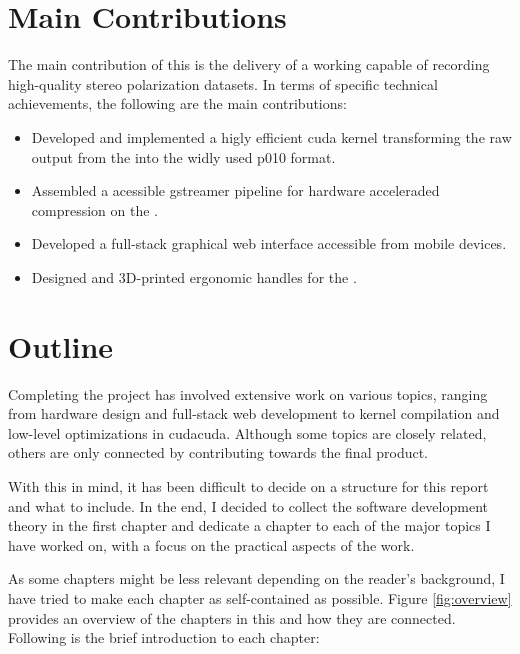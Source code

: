 \section{Main Contributions}
The main contribution of this \master is the delivery of a working \sr capable of recording high-quality stereo polarization datasets.
In terms of specific technical achievements, the following are the main contributions:

\begin{itemize}
    \item Developed and implemented a higly efficient \gls{cuda} kernel transforming the raw output from the \cams into the widly used \gls{p010} format.
    \item Assembled a \py acessible \gls{gstreamer} pipeline for hardware acceleraded compression on the \jx.
    \item Developed a full-stack graphical web interface accessible from mobile devices.
    \item Designed and 3D-printed ergonomic handles for the \sr.
\end{itemize}


\section{Outline}
Completing the \sr project has involved extensive work on various topics, ranging from hardware design and full-stack web development to kernel compilation and low-level optimizations in \gls{cuda}{cuda}.
Although some topics are closely related, others are only connected by contributing towards the final product.

With this in mind, it has been difficult to decide on a structure for this report and what to include.
In the end, I decided to collect the software development theory in the first chapter and dedicate a chapter to each of the major topics I have worked on, with a focus on the practical aspects of the work.

As some chapters might be less relevant depending on the reader's background, I have tried to make each chapter as self-contained as possible.
Figure \ref{fig:overview} provides an overview of the chapters in this \master and how they are connected.
Following is the brief introduction to each chapter:

